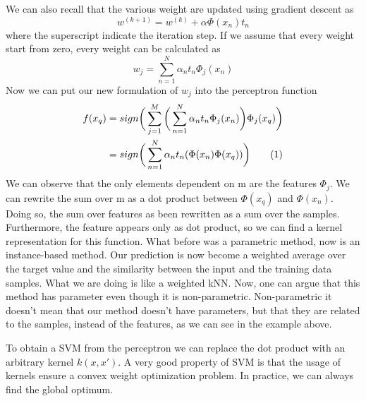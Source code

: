 \documentclass[main.tex]{subfiles}
\newcommand\numberthis{\addtocounter{equation}{1}\tag{\theequation}}
\begin{document}
We can also recall that the various weight are updated using gradient descent as
\begin{equation*}
    w^{(k+1)} = w^{(k)} + \alpha \Phi(x_n)t_n
\end{equation*}
where the superscript indicate the iteration step. If we assume that every weight start from zero, every weight can be calculated as
\begin{equation*}
    w_j = \sum_{n=1}^N \alpha_n t_n \Phi_j(x_n)
\end{equation*}
Now we can put our new formulation of $w_j$ into the perceptron function
\begin{align*}
    f(x_q) & = sign \bigg( \sum_{j=1}^M \bigg( \sum_{n=1}^N \alpha_n t_n \Phi_j(x_n) \bigg) \Phi_j(x_q) \bigg) \\
           & = sign \bigg( \sum_{n=1}^N \alpha_n t_n (\Phi(x_n) \Phi(x_q)) \bigg) \numberthis
\end{align*}
We can observe that the only elements dependent on m are the features $\Phi_j$. We can rewrite the sum over m as a dot product between $\Phi(x_q)$ and $\Phi(x_n)$. Doing so, the sum over features as been rewritten as a sum over the samples. Furthermore, the feature appears only as dot product, so we can find a kernel representation for this function. What before was a parametric method, now is an instance-based method. Our prediction is now become a weighted average over the target value and the similarity between the input and the training data samples. What we are doing is like a weighted kNN.
Now, one can argue that this method has parameter even though it is non-parametric. Non-parametric it doesn't mean that our method doesn't have parameters, but that they are related to the samples, instead of the features, as we can see in the example above.

To obtain a SVM from the perceptron we can replace the dot product with an arbitrary kernel $k(x,x')$. A very good property of SVM is that the usage of kernels ensure a convex weight optimization problem. In practice, we can always find the global optimum.
\end{document}
